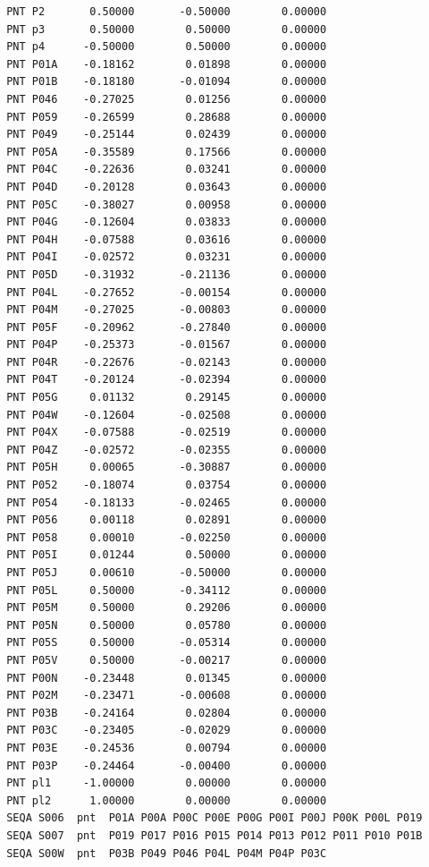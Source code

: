 \documentclass{article}
\begin{document}
\begin{appendix}
\begin{verbatim}
 PNT P2       0.50000       -0.50000        0.00000 
 PNT p3       0.50000        0.50000        0.00000 
 PNT p4      -0.50000        0.50000        0.00000 
 PNT P01A    -0.18162        0.01898        0.00000 
 PNT P01B    -0.18180       -0.01094        0.00000 
 PNT P046    -0.27025        0.01256        0.00000 
 PNT P059    -0.26599        0.28688        0.00000 
 PNT P049    -0.25144        0.02439        0.00000 
 PNT P05A    -0.35589        0.17566        0.00000 
 PNT P04C    -0.22636        0.03241        0.00000 
 PNT P04D    -0.20128        0.03643        0.00000 
 PNT P05C    -0.38027        0.00958        0.00000 
 PNT P04G    -0.12604        0.03833        0.00000 
 PNT P04H    -0.07588        0.03616        0.00000 
 PNT P04I    -0.02572        0.03231        0.00000 
 PNT P05D    -0.31932       -0.21136        0.00000 
 PNT P04L    -0.27652       -0.00154        0.00000 
 PNT P04M    -0.27025       -0.00803        0.00000 
 PNT P05F    -0.20962       -0.27840        0.00000 
 PNT P04P    -0.25373       -0.01567        0.00000 
 PNT P04R    -0.22676       -0.02143        0.00000 
 PNT P04T    -0.20124       -0.02394        0.00000 
 PNT P05G     0.01132        0.29145        0.00000 
 PNT P04W    -0.12604       -0.02508        0.00000 
 PNT P04X    -0.07588       -0.02519        0.00000 
 PNT P04Z    -0.02572       -0.02355        0.00000 
 PNT P05H     0.00065       -0.30887        0.00000 
 PNT P052    -0.18074        0.03754        0.00000 
 PNT P054    -0.18133       -0.02465        0.00000 
 PNT P056     0.00118        0.02891        0.00000 
 PNT P058     0.00010       -0.02250        0.00000 
 PNT P05I     0.01244        0.50000        0.00000 
 PNT P05J     0.00610       -0.50000        0.00000 
 PNT P05L     0.50000       -0.34112        0.00000 
 PNT P05M     0.50000        0.29206        0.00000 
 PNT P05N     0.50000        0.05780        0.00000 
 PNT P05S     0.50000       -0.05314        0.00000 
 PNT P05V     0.50000       -0.00217        0.00000 
 PNT P00N    -0.23448        0.01345        0.00000 
 PNT P02M    -0.23471       -0.00608        0.00000 
 PNT P03B    -0.24164        0.02804        0.00000 
 PNT P03C    -0.23405       -0.02029        0.00000 
 PNT P03E    -0.24536        0.00794        0.00000 
 PNT P03P    -0.24464       -0.00400        0.00000 
 PNT pl1     -1.00000        0.00000        0.00000 
 PNT pl2      1.00000        0.00000        0.00000 
 SEQA S006  pnt  P01A P00A P00C P00E P00G P00I P00J P00K P00L P019
 SEQA S007  pnt  P019 P017 P016 P015 P014 P013 P012 P011 P010 P01B
 SEQA S00W  pnt  P03B P049 P046 P04L P04M P04P P03C

\end{verbatim}
\end{appendix}
\end{document}
